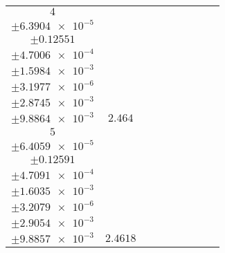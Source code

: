 \documentclass[8pt]{article}
\begin{document}
\begin{longtable}[l]{c c c c c c c c c}
$\num{4}$ & \begin{tabular}[c]{@{}c@{}}$\num{2.988e-2}$ \\ $\pm\num{6.3904e-5}$\end{tabular} & \begin{tabular}[c]{@{}c@{}}$\num{-0.35285}$ \\ $\pm\num{0.12551}$\end{tabular} & \begin{tabular}[c]{@{}c@{}}$\num{-4.9838}$ \\ $\pm\num{4.7006e-4}$\end{tabular} & \begin{tabular}[c]{@{}c@{}}$\num{725.74}$ \\ $\pm\num{1.5984e-3}$\end{tabular} & \begin{tabular}[c]{@{}c@{}}$\num{1.4519}$ \\ $\pm\num{3.1977e-6}$\end{tabular} & \begin{tabular}[c]{@{}c@{}}$\num{1.1473}$ \\ $\pm\num{2.8745e-3}$\end{tabular} & \begin{tabular}[c]{@{}c@{}}$\num{4.1877}$ \\ $\pm\num{9.8864e-3}$\end{tabular} & $\num{2.464}$\\
$\num{5}$ & \begin{tabular}[c]{@{}c@{}}$\num{2.975e-2}$ \\ $\pm\num{6.4059e-5}$\end{tabular} & \begin{tabular}[c]{@{}c@{}}$\num{0.65012}$ \\ $\pm\num{0.12591}$\end{tabular} & \begin{tabular}[c]{@{}c@{}}$\num{4.9821}$ \\ $\pm\num{4.7091e-4}$\end{tabular} & \begin{tabular}[c]{@{}c@{}}$\num{735.68}$ \\ $\pm\num{1.6035e-3}$\end{tabular} & \begin{tabular}[c]{@{}c@{}}$\num{1.4718}$ \\ $\pm\num{3.2079e-6}$\end{tabular} & \begin{tabular}[c]{@{}c@{}}$\num{1.1499}$ \\ $\pm\num{2.9054e-3}$\end{tabular} & \begin{tabular}[c]{@{}c@{}}$\num{4.1762}$ \\ $\pm\num{9.8857e-3}$\end{tabular} & $\num{2.4618}$\\

\end{longtable}
\end{document}
